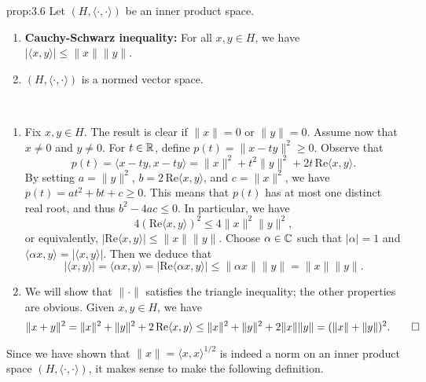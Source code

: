 \begin{prop}{prop:3.6}
    Let $(H, \langle \cdot, \cdot \rangle)$ be an inner product space. 
    \begin{enumerate}[(1)]
        \item {\bf Cauchy-Schwarz inequality:} For all $x, y \in H$, 
        we have $|\langle x, y \rangle| \leq \|x\|\|y\|$. 
        \item $(H, \langle \cdot, \cdot \rangle)$ is a normed vector space. 
    \end{enumerate}
\end{prop}
\begin{pf}~
    \begin{enumerate}[(1)]

        \item Fix $x, y \in H$. The result is clear if $\|x\| = 0$ or 
        $\|y\| = 0$. Assume now that $x \neq 0$ and $y \neq 0$. For 
        $t \in \mathbb{R}$, define $p(t) = \|x - ty\|^2 \geq 0$. Observe that 
        \[ p(t) = \langle x - ty, x - ty \rangle = \|x\|^2 
        + t^2 \|y\|^2 + 2t\,\text{Re}\langle x, y \rangle. \] 
        By setting $a = \|y\|^2$, $b = 2\,\text{Re}\langle x, y \rangle$, 
        and $c = \|x\|^2$, we have $p(t) = at^2 + bt + c \geq 0$. 
        This means that $p(t)$ has at most one distinct real root, 
        and thus $b^2 - 4ac \leq 0$. In particular, we have 
        \[ 4(\text{Re}\langle x, y \rangle)^2 \leq 4\|x\|^2\|y\|^2, \] 
        or equivalently, $|\text{Re}\langle x, y \rangle| \leq \|x\|\|y\|$. 
        Choose $\alpha \in \mathbb{C}$ such that $|\alpha| = 1$ and 
        $\langle \alpha x, y \rangle = |\langle x, y \rangle|$. Then 
        we deduce that 
        \[ |\langle x, y \rangle| = \langle \alpha x, y \rangle
        = |\text{Re}\langle \alpha x, y \rangle| \leq \|\alpha x\|\|y\| 
        = \|x\|\|y\|. \] 

        \item We will show that $\|\cdot\|$ satisfies the triangle 
        inequality; the other properties are obvious. Given $x, y \in H$, 
        we have 
        \[ \|x + y\|^2 = \|x\|^2 + \|y\|^2 + 2\,\text{Re}\langle x, y \rangle 
        \leq \|x\|^2 + \|y\|^2 + 2\|x\|\|y\| = (\|x\| + \|y\|)^2. \qedhere \] 
    \end{enumerate}
\end{pf}

Since we have shown that $\|x\| = \langle x, x \rangle^{1/2}$ is indeed a 
norm on an inner product space $(H, \langle \cdot, \cdot \rangle)$, it 
makes sense to make the following definition. 

